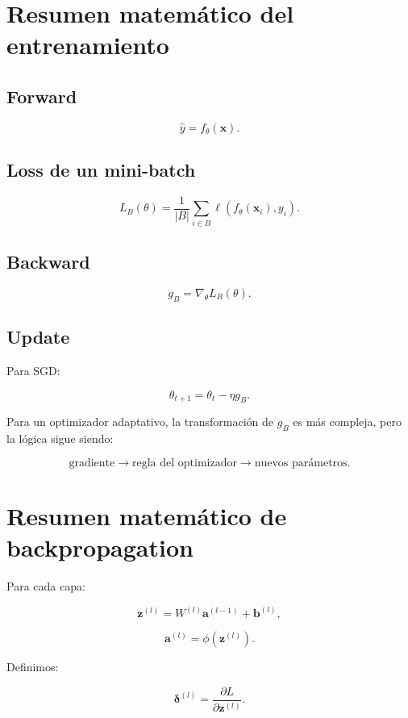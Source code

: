 \documentclass[
  letterpaper,
  DIV=11,
  numbers=noendperiod]{scrartcl}
\begin{document}
\section{Resumen matemático del
entrenamiento}\label{resumen-matemuxe1tico-del-entrenamiento}

\subsection{Forward}\label{forward}

\[
\hat y=f_\theta(\mathbf x).
\]

\subsection{Loss de un mini-batch}\label{loss-de-un-mini-batch}

\[
L_B(\theta)
=
\frac1{|B|}
\sum_{i\in B}
\ell(f_\theta(\mathbf x_i),y_i).
\]

\subsection{Backward}\label{backward}

\[
g_B
=
\nabla_\theta L_B(\theta).
\]

\subsection{Update}\label{update}

Para SGD:

\[
\theta_{t+1}
=
\theta_t-\eta g_B.
\]

Para un optimizador adaptativo, la transformación de \(g_B\) es más
compleja, pero la lógica sigue siendo:

\[
\boxed{
\text{gradiente}
\rightarrow
\text{regla del optimizador}
\rightarrow
\text{nuevos parámetros}.
}
\]

\section{Resumen matemático de
backpropagation}\label{resumen-matemuxe1tico-de-backpropagation}

Para cada capa:

\[
\mathbf z^{(l)}
=
W^{(l)}
\mathbf a^{(l-1)}
+
\mathbf b^{(l)},
\]

\[
\mathbf a^{(l)}
=
\phi(\mathbf z^{(l)}).
\]

Definimos:

\[
\boldsymbol\delta^{(l)}
=
\frac{\partial L}
{\partial\mathbf z^{(l)}}.
\]
\end{document}
